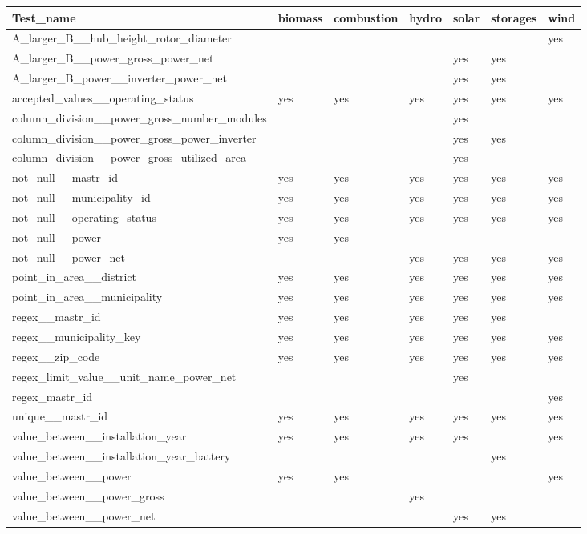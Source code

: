 \begin{tabular}{lllllll}
\toprule
Test_name & biomass & combustion & hydro & solar & storages & wind \\
\midrule
A_larger_B__hub_height_rotor_diameter &  &  &  &  &  & yes \\
A_larger_B__power_gross_power_net &  &  &  & yes & yes &  \\
A_larger_B_power__inverter_power_net &  &  &  & yes & yes &  \\
accepted_values__operating_status & yes & yes & yes & yes & yes & yes \\
column_division__power_gross_number_modules &  &  &  & yes &  &  \\
column_division__power_gross_power_inverter &  &  &  & yes & yes &  \\
column_division__power_gross_utilized_area &  &  &  & yes &  &  \\
not_null__mastr_id & yes & yes & yes & yes & yes & yes \\
not_null__municipality_id & yes & yes & yes & yes & yes & yes \\
not_null__operating_status & yes & yes & yes & yes & yes & yes \\
not_null__power & yes & yes &  &  &  &  \\
not_null__power_net &  &  & yes & yes & yes & yes \\
point_in_area__district & yes & yes & yes & yes & yes & yes \\
point_in_area__municipality & yes & yes & yes & yes & yes & yes \\
regex__mastr_id & yes & yes & yes & yes & yes &  \\
regex__municipality_key & yes & yes & yes & yes & yes & yes \\
regex__zip_code & yes & yes & yes & yes & yes & yes \\
regex_limit_value__unit_name_power_net &  &  &  & yes &  &  \\
regex_mastr_id &  &  &  &  &  & yes \\
unique__mastr_id & yes & yes & yes & yes & yes & yes \\
value_between__installation_year & yes & yes & yes & yes &  & yes \\
value_between__installation_year_battery &  &  &  &  & yes &  \\
value_between__power & yes & yes &  &  &  & yes \\
value_between__power_gross &  &  & yes &  &  &  \\
value_between__power_net &  &  &  & yes & yes &  \\
\bottomrule
\end{tabular}
